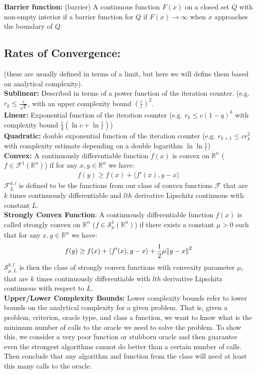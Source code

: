 \documentclass[12pt,a4paper]{article}
\begin{document}
	\textbf{Barrier function:} (barrier) A continuous function $F(x)$ on a closed set $Q$ with non-empty interior if a barrier function for $Q$ if $F(x)\rightarrow \infty$ when $x$ approaches the boundary of $Q$.
	\subsection*{Rates of Convergence:}
	(these are usually defined in terms of a limit, but here we will define them based on analytical complexity).\\
	\textbf{Sublinear:} Described in terms of a power function of the iteration counter. (e.g. $r_k \leq \frac{c}{\sqrt{k}}$, with an upper complexity bound $(\frac{c}{\epsilon})^2$.\\
	\textbf{Linear:} Exponential function of the iteration counter (e.g. $r_k \leq c(1 - q)^k$ with complexity bound $\frac{1}{q}(\ln c + \ln \frac{1}{\epsilon})$)\\
	\textbf{Quadratic:} double exponential function of the iteration counter (e.g. $r_{k+1} \leq cr_k^2$ with complexity estimate depending on a double logarithm $\ln \ln \frac{1}{\epsilon}$) \\
	\textbf{Convex:} A continuously differentiable function $f(x)$ is convex on $\mathbb{R}^n$ ($f \in \mathcal{F}^1(\mathbb{R}^n)$) if for any $x,y\in \mathbb{R}^n$ we have:
	\begin{align*}
		f(y)\geq f(x) + \langle f'(x), y-x \rangle 
	\end{align*}
	\textbf{$\mathcal{F}_L^{k,l}$} is defined to be the functions from our class of convex functions $\mathcal{F}$ that are $k$ times continuously differentiable and $lth$ derivative Lipschitz continuous with constant $L$. \\
	\textbf{Strongly Convex Function}: A continuously differentiable function $f(x)$ is called strongly convex on $\mathbb{R}^n$ ($f \in \mathcal{S}_\mu^1(\mathbb{R}^n)$) if there exists a constant $\mu > 0$ such that for any $x,y \in \mathbb{R}^n$ we have:
	\begin{align*}
		f(y) \geq f(x) + \langle f'(x), y - x \rangle + \frac{1}{2}\mu \norm{y - x}^2
	\end{align*}
	\textbf{$\mathcal{S}_{\mu, L}^{k,l}$} is then the class of strongly convex functions with convexity parameter $\mu$, that are $k$ times continuously differentiable with $lth$ derivative Lipschitz continuous with respect to $L$.\\
	\textbf{Upper/Lower Complexity Bounds:} Lower complexity bounds refer to lower bounds on the analytical complexity for a given problem. That is, given a problem, criterion, oracle type, and class a function, we want to know what is the minimum number of calls to the oracle we need to solve the problem. To show this, we consider a very poor function or stubborn oracle and then guarantee even the strongest algorithms cannot do better than a certain number of calls. Then conclude that any algorithm and function from the class will need at least this many calls to the oracle.   \\
\end{document}

